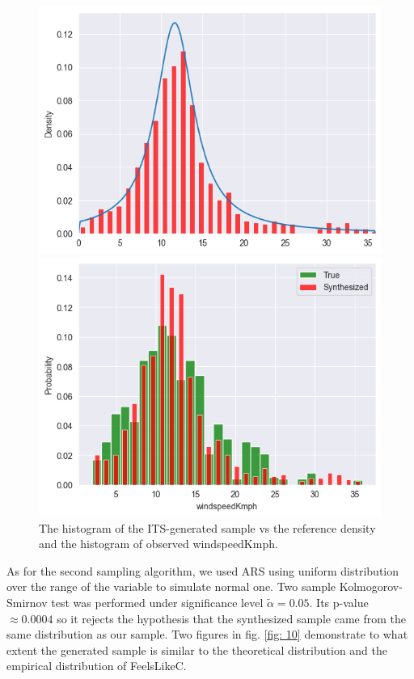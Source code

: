 \documentclass[12pt, bachelor, substylefile = algo_title.rtx]{disser}
\theoremstyle{definition}
\begin{document}
\begin{figure}[!h]
   \begin{minipage}{.48\textwidth}
     \includegraphics[width=\linewidth]{itsws1}
   \end{minipage} \hfill
\begin{minipage}{.48\textwidth}
     \includegraphics[width=\linewidth]{itsws}
   \end{minipage}
\caption{The histogram of the ITS-generated sample vs the reference density and the histogram of observed windspeedKmph.} 
\label{fig: 9}
\end{figure}

As for the second sampling algorithm, we used ARS using uniform distribution over the range of the variable to simulate normal one. Two sample Kolmogorov-Smirnov test was performed under significance level $\widetilde{\alpha} = 0.05$. Its p-value$ \approx 0.0004$ so it rejects the hypothesis that the synthesized sample came from the same distribution as our sample. Two figures in fig. \ref{fig: 10} demonstrate to what extent the generated sample is similar to the theoretical distribution and the empirical distribution of FeelsLikeC.
\end{document}

